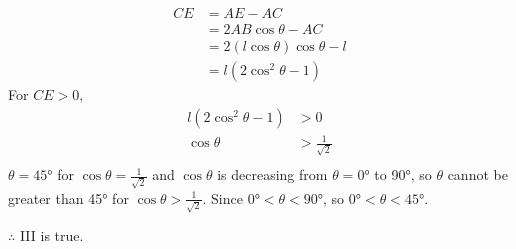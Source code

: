 \documentclass[varwidth=70mm]{standalone}
\begin{document}
\begin{answer}
\begin{equation*}
\begin{aligned}
CE &= AE - AC \\
   &= 2AB\cos\theta - AC \\
   &= 2(l\cos\theta)\cos\theta - l \\
   &= l(2\cos^2\theta - 1)
\end{aligned}
\end{equation*}
For $CE > 0$,
\begin{equation*}
\begin{aligned}
l(2\cos^2\theta - 1) &> 0 \\
			\cos\theta &> \frac{1}{\sqrt{2}} \\
\end{aligned}
\end{equation*}
$\theta = \ang{45}$ for $\cos\theta = \frac{1}{\sqrt{2}}$ and $\cos\theta$ is decreasing from $\theta = \ang{0}$ to \ang{90}, so $\theta$ cannot be greater than \ang{45} for $\cos\theta > \frac{1}{\sqrt{2}}$. Since $\ang{0} < \theta < \ang{90}$, so $\ang{0} < \theta < \ang{45}$.\par
$\therefore$ III is true.
\end{answer}
\end{document}
